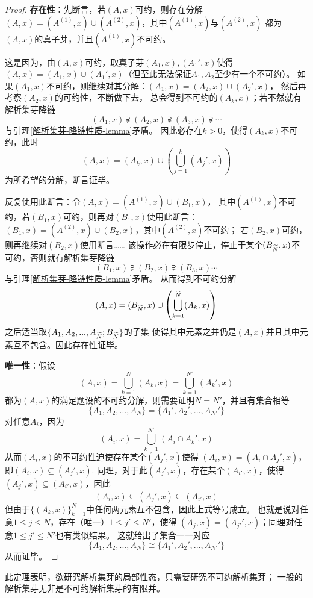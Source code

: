 \begin{proof}
\textbf{存在性}：先断言，若$(A,x)$可约，则存在分解
$(A,x)=(A^{(1)},x)\cup(A^{(2)},x)$，其中$(A^{(1)},x)$与$(A^{(2)},x)$
都为$(A,x)$的真子芽，并且$(A^{(1)},x)$不可约。

这是因为，由$(A,x)$可约，取真子芽$(A_1,x),(A_1',x)$使得
$(A,x)=(A_1,x)\cup (A_1',x)$（但至此无法保证$A_1,A_2$至少有一个不可约）。
如果$(A_1,x)$不可约，则继续对其分解：$(A_1,x)=(A_2,x)\cup(A_2',x)$，
然后再考察$(A_2,x)$的可约性，不断做下去，
总会得到不可约的$(A_k,x)$；若不然就有解析集芽降链
$$(A_1,x)\supsetneqq (A_2,x)\supsetneqq (A_3,x)\supsetneqq\cdots$$
与引理\ref{解析集芽-降链性质-lemma}矛盾。
因此必存在$k>0$，使得$(A_k,x)$不可约，此时
$$(A,x)=(A_k,x)\cup
\left(
  \bigcup_{j=1}^k
    (A_j',x)
\right)
$$
为所希望的分解，断言证毕。

反复使用此断言：令$(A,x)=(A^{(1)},x)\cup (B_1,x)$，
其中$(A^{(1)},x)$不可约，若$(B_1,x)$可约，则再对$(B_1,x)$使用此断言：
$(B_1,x)=(A^{(2)},x)\cup(B_2,x)$，其中$(A^{(2)},x)$不可约；
若$(B_2,x)$可约，则再继续对$(B_2,x)$使用断言……
该操作必在有限步停止，停止于某个$(B_{\widetilde{N}},x)$不可约，否则就有解析集芽降链
$$(B_1,x)\supsetneqq(B_2,x)\supsetneqq(B_3,x)\cdots$$
与引理\ref{解析集芽-降链性质-lemma}矛盾。
从而得到不可约分解
$$(A,x)=(B_{\widetilde{N}},x)\cup
\left(
  \bigcup_{k=1}^{\widetilde{N}}(A_k,x)
\right)
$$
之后适当取$\{A_1,A_2,...,A_{\widetilde{N}};B_{\widetilde{N}}\}$的子集
使得其中元素之并仍是$(A,x)$并且其中元素互不包含。因此存在性证毕。

\textbf{唯一性}：假设
$$(A,x)=\bigcup_{k=1}^N(A_k,x)=\bigcup_{k=1}^{N'}(A_k',x)$$
都为$(A,x)$的满足题设的不可约分解，则需要证明$N=N'$，并且有集合相等
$$\{A_1,A_2,...,A_N\}=\{A_1',A_2',...,A_{N'}'\}$$
对任意$A_i$，因为
$$(A_i,x)=\bigcup_{k=1}^{N'}(A_i\cap A_k',x)$$
从而$(A_i,x)$的不可约性迫使存在某个$(A_j',x)$使得
$(A_i,x)=(A_i\cap A_j',x)$，即$(A_i,x)\subseteq (A_j',x)$.
同理，对于此$(A_j',x)$，存在某个$(A_{i'},x)$，使得
$(A_j',x)\subseteq(A_{i'},x)$，因此
$$(A_i,x)\subseteq(A_j',x)\subseteq(A_{i'},x)$$
但由于$\{(A_k,x)\}_{k=1}^N$中任何两元素互不包含，因此上式等号成立。
也就是说对任意$1\leq j\leq N$，存在（唯一）$1\leq j'\leq N'$，使得
$(A_j,x)=(A_{j'}',x)$；同理对任意$1\leq j'\leq N'$也有类似结果。
这就给出了集合一一对应
$$\{A_1,A_2,...,A_N\}\cong\{A_1',A_2',...,A_{N'}'\}$$
从而证毕。
\end{proof}

\begin{rem}
此定理表明，欲研究解析集芽的局部性态，只需要研究不可约解析集芽；
一般的解析集芽无非是不可约解析集芽的有限并。
\end{rem}


